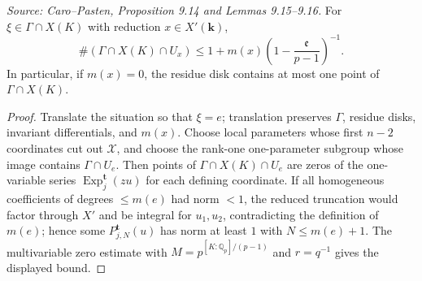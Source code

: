 \begin{proposition}
  \label{prop:cp_residue_disk_bound}
  \textit{Source: Caro--Pasten, Proposition 9.14 and Lemmas 9.15--9.16.}
  For \(\xi\in\Gamma\cap X(K)\) with reduction \(x\in X'(\mathbf k)\),
  \[
    \#(\Gamma\cap X(K)\cap U_x)
    \le 1+m(x)\left(1-\frac{\mathfrak e}{p-1}\right)^{-1}.
  \]
  In particular, if \(m(x)=0\), the residue disk contains at most one point of
  \(\Gamma\cap X(K)\).
\end{proposition}
\begin{proof}
  Translate the situation so that \(\xi=e\); translation preserves \(\Gamma\),
  residue disks, invariant differentials, and \(m(x)\).  Choose local
  parameters whose first \(n-2\) coordinates cut out \(\mathcal X\), and choose
  the rank-one one-parameter subgroup whose image contains \(\Gamma\cap U_e\).
  Then points of \(\Gamma\cap X(K)\cap U_e\) are zeros of the one-variable
  series \(\operatorname{Exp}^{\mathbf t}_j(zu)\) for each defining coordinate.
  If all homogeneous coefficients of degrees \(\le m(e)\) had norm \(<1\),
  the reduced truncation would factor through \(X'\) and be integral for
  \(u_1,u_2\), contradicting the definition of \(m(e)\); hence some
  \(P_{j,N}^{\mathbf t}(u)\) has norm at least \(1\) with \(N\le m(e)+1\).
  The multivariable zero estimate with
  \(M=p^{[K:\mathbb Q_p]/(p-1)}\) and \(r=q^{-1}\) gives the displayed bound.
\end{proof}

